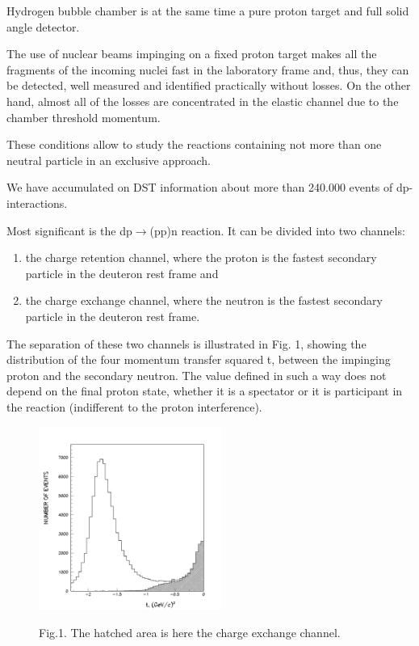 \documentclass[a4paper,12pt]{article}
\begin{document}
Hydrogen bubble chamber is at the same time a pure proton target and full solid
angle detector.

The use of nuclear beams impinging on a fixed proton target makes all the
fragments of the incoming nuclei fast in the laboratory frame and, thus, they
can be detected, well measured and identified practically without losses. On the
other hand, almost all of the losses are concentrated in the elastic channel due
to the chamber threshold momentum.

These conditions allow to study the reactions containing not more than one
neutral particle in an exclusive approach.

We have accumulated on DST information about  more than 240.000 events of dp-
interactions.

Most significant is the dp$\to$(pp)n  reaction. It can be divided into two
channels:

\begin{enumerate}
\item the charge retention channel, where the proton is the fastest secondary
  particle in the deuteron rest frame and
\item the charge exchange channel, where the neutron is the fastest secondary
  particle in the deuteron rest frame.
\end{enumerate}


The separation of these two channels is illustrated in Fig. 1, showing the
distribution of the four momentum transfer squared t, between the impinging
proton and the secondary neutron. The value defined in such a way does not
depend on the final proton state, whether it is a spectator or it is participant
in the reaction (indifferent to the proton interference).

\begin{figure}[hbt]
  \begin{center}
    \includegraphics[width=6cm]{dist.pdf}
  \end{center}
  \vspace{0.4mm}
  \noindent
  Fig.1. The hatched area is here the charge exchange channel.\\
\end{figure}
\end{document}
